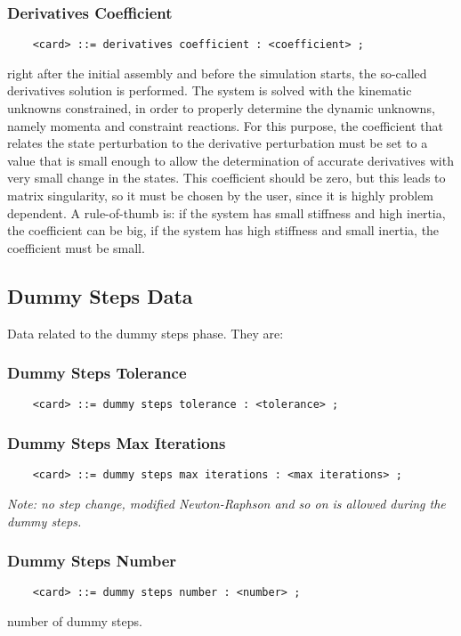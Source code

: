 \subsubsection{Derivatives Coefficient}
\begin{verbatim}
    <card> ::= derivatives coefficient : <coefficient> ;
\end{verbatim}
right after the initial assembly and before the simulation starts, the
so-called derivatives solution is performed. The system is solved with
the kinematic unknowns constrained, in order to properly determine the
dynamic unknowns, namely momenta and constraint reactions. For this
purpose, the coefficient that relates the state perturbation to the
derivative perturbation must be set to a value that is small enough to
allow the determination of accurate derivatives with very small change
in the states. This coefficient should be zero, but this leads to matrix
singularity, so it must be chosen by the user, since it is highly
problem dependent. A rule-of-thumb is: if the system has small
stiffness and high inertia, the coefficient can be big, if the system
has high stiffness and small inertia, the coefficient must be small.


\subsection{Dummy Steps Data}
Data related to the dummy steps phase. They are:

\subsubsection{Dummy Steps Tolerance}
\begin{verbatim}
    <card> ::= dummy steps tolerance : <tolerance> ;
\end{verbatim}

\subsubsection{Dummy Steps Max Iterations}
\begin{verbatim}
    <card> ::= dummy steps max iterations : <max iterations> ;
\end{verbatim}    
{\em
    Note: no step change, modified Newton-Raphson and so on is allowed
    during the dummy steps.
}

\subsubsection{Dummy Steps Number}
\begin{verbatim}
    <card> ::= dummy steps number : <number> ;
\end{verbatim}
number of dummy steps.

